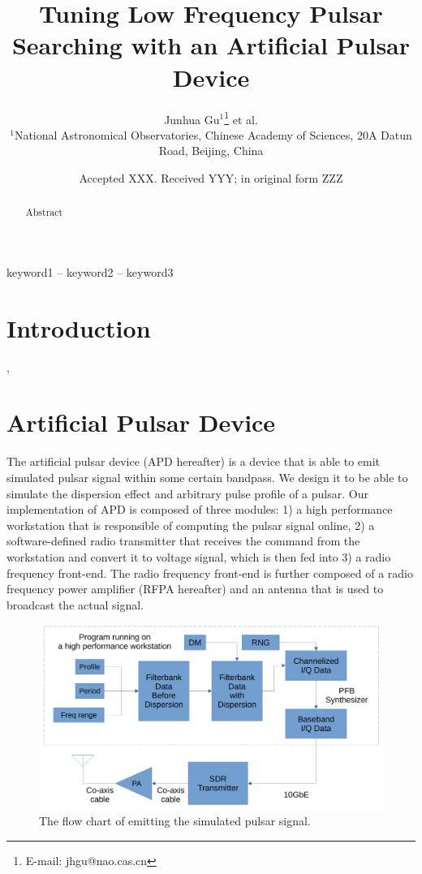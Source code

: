 \documentclass[fleqn,usenatbib]{mnras}
\title[Artificial Pulsar]{Tuning Low Frequency Pulsar Searching with an  Artificial Pulsar Device}
\author[J.-H. Gu et al.]{
Junhua Gu$^{1}$\thanks{E-mail: jhgu@nao.cas.cn} et al.
\\
$^{1}$National Astronomical Observatories, Chinese Academy of Sciences, 20A Datun Road, Beijing, China
}
\date{Accepted XXX. Received YYY; in original form ZZZ}
\begin{document}
\label{firstpage}
\pagerange{\pageref{firstpage}--\pageref{lastpage}}
\maketitle

\begin{abstract}
Abstract
\end{abstract}

\begin{keywords}
keyword1 -- keyword2 -- keyword3
\end{keywords}

\section{Introduction}
\citet{2017AAS...22915516P}, \citet{2011AAS...21723406S}

\section{Artificial Pulsar Device}
The artificial pulsar device (APD hereafter) is a device that is able to emit simulated pulsar signal within some certain bandpass.
We design it to be able to simulate the dispersion effect and arbitrary pulse profile of a pulsar.
Our implementation of APD is composed of three modules: 1) a high performance workstation that is responsible of computing the pulsar signal online, 2) a software-defined radio transmitter that receives the command from the workstation and convert it to voltage signal, which is then fed into 3) a radio frequency front-end. 
The radio frequency front-end is further composed of a radio frequency power amplifier (RFPA hereafter) and an antenna that is used to broadcast the actual signal.

\begin{figure}
    \centering
    \includegraphics[width=0.95\columnwidth]{flow_chart.pdf}
    \caption{The flow chart of emitting the simulated pulsar signal.
    }
    \label{fig:flow_chart}
\end{figure}
\end{document}
